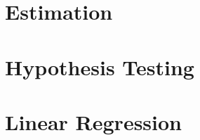 \documentclass[british,11pt,a4paper]{report}
\begin{document}
\maketitle
\tableofcontents

\chapter{Estimation}

\chapter{Hypothesis Testing}

\chapter{Linear Regression}
%
\end{document}
